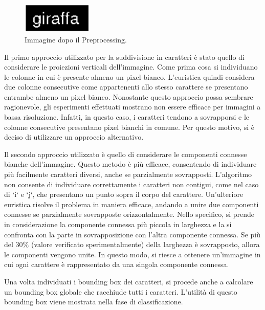 \begin{figure}[H]
	\centering
	\includegraphics[width=0.3\textwidth]{images/giraffa-bin.png}
	\caption{Immagine dopo il Preprocessing.}
	\label{fig:giraffabin}
\end{figure}

Il primo approccio utilizzato per la suddivisione in caratteri è stato quello di considerare le proiezioni verticali dell'immagine. Come prima cosa si individuano le colonne in cui è presente almeno un pixel bianco.
L'euristica quindi considera due colonne consecutive come appartenenti allo stesso carattere se presentano entrambe almeno un pixel bianco. Nonostante questo approccio possa sembrare ragionevole, gli esperimenti effettuati mostrano non essere efficace per immagini a bassa risoluzione. Infatti, in questo caso, i caratteri tendono a sovrapporsi e le colonne consecutive presentano pixel bianchi in comune. Per questo motivo, si è deciso di utilizzare un approccio alternativo.
\newline

Il secondo approccio utilizzato è quello di considerare le componenti connesse bianche dell'immagine. Questo metodo è più efficace, consentendo di individuare più facilmente caratteri diversi, anche se parzialmente sovrapposti. L'algoritmo non consente di individuare correttamente i caratteri non contigui, come nel caso di `i` e `j`, che presentano un punto sopra il corpo del carattere. Un'ulteriore euristica risolve il problema in maniera efficace, andando a unire due componenti connesse se parzialmente sovrapposte orizzontalmente. Nello specifico, si prende in considerazione la componente connessa più piccola in larghezza e la si confronta con la parte in sovrapposizione con l'altra componente connessa. Se più del 30\% (valore verificato sperimentalmente) della larghezza è sovrapposto, allora le componenti vengono unite. In questo modo, si riesce a ottenere un'immagine in cui ogni carattere è rappresentato da una singola componente connessa.
\newline

Una volta individuati i bounding box dei caratteri, si procede anche a calcolare un bounding box globale che racchiude tutti i caratteri. L'utilità di questo bounding box viene mostrata nella fase di classificazione.

